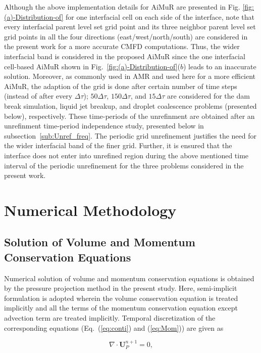 \documentclass[preprint,12pt]{elsarticle}
\newcommand{\review}[1]{\color{black}#1}
\begin{document}
Although the above implementation details for AiMuR are presented in Fig. \ref{fig:(a)-Distribution-of}
for one interfacial cell on each side of the interface, note that
every interfacial parent level set grid point and its three neighbor
parent level set grid points in all the four directions (east/west/north/south)
are considered in the present work for a more accurate CMFD computations.
Thus, the wider interfacial band is considered in the proposed AiMuR since
the one interfacial cell-based AiMuR shown in Fig.~\ref{fig:(a)-Distribution-of}($b$)
 leads to an inaccurate solution. Moreover, as commonly used in AMR
\cite{popinet2009,theodorakakos2004} and used here for a more efficient AiMuR, the adaption of the grid is
done after certain number of time steps (instead of after every $\Delta\tau$); $50\Delta\tau$, $150\Delta\tau$, and $15\Delta\tau$ are considered for the dam break simulation, liquid jet breakup, and droplet coalescence problems (presented below), respectively. \review{These time-periods of the unrefinment are obtained after an unrefinment time-period independence study, presented below in subsection~\ref{sub:Unref_freq}.} The periodic grid unrefinement  justifies the need for the wider
interfacial band of the finer grid. Further, it is ensured that the interface
does not enter into unrefined region during the above mentioned time
interval of the periodic unrefinement for the three problems considered in the present work. 

\section{Numerical Methodology}\label{sec:method}


\subsection{Solution of Volume and Momentum Conservation Equations}

Numerical solution of volume and momentum conservation equations is
obtained by the pressure projection method  in the present study. Here,
semi-implicit formulation is adopted wherein the volume conservation
equation is treated implicitly and all the terms of the momentum conservation
equation  except advection term are treated implicitly.
Temporal discretization of the corresponding equations (Eq.~(\ref{eq:conti})
and (\ref{eq:Mom})) are given as

\begin{equation}
\nabla\cdot\mathbf{U}_{P}^{n+1}=0,\label{eq:volume conservation}
\end{equation}
\end{document}
